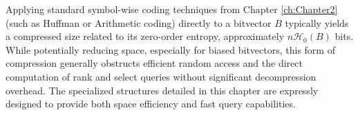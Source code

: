 \begin{remark}
    Applying standard symbol-wise coding techniques from Chapter \ref{ch:Chapter2} (such as Huffman or Arithmetic coding) directly to a bitvector $B$ typically yields a compressed size related to its zero-order entropy, approximately $n\mathcal{H}_0(B)$ bits. While potentially reducing space, especially for biased bitvectors, this form of compression generally obstructs efficient random access and the direct computation of \textsf{rank} and \textsf{select} queries without significant decompression overhead. The specialized structures detailed in this chapter are expressly designed to provide both space efficiency and fast query capabilities.
\end{remark}




